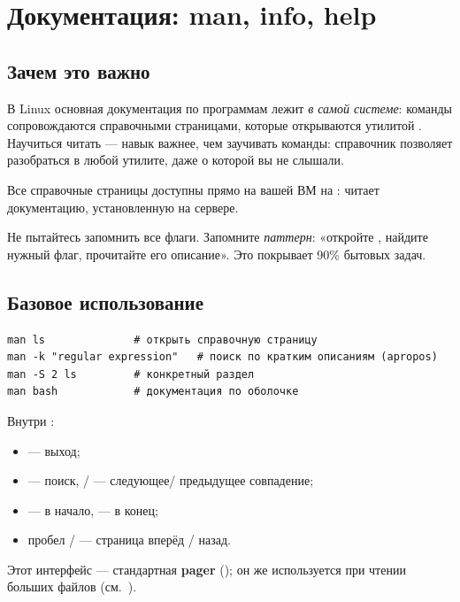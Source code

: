 \chapter{Документация: man, info, help}
\label{ch:06-man}

\section{Зачем это важно}

В Linux основная документация по программам лежит \emph{в самой
системе}: команды сопровождаются справочными страницами, которые
открываются утилитой . Научиться читать  ---
навык важнее, чем заучивать команды: справочник позволяет
разобраться в любой утилите, даже о которой вы не слышали.

Все справочные страницы доступны прямо на вашей ВМ на
:  читает документацию, установленную
на сервере.

\begin{tipbox}
Не пытайтесь запомнить все флаги. Запомните \emph{паттерн}:
«откройте , найдите нужный флаг, прочитайте его
описание». Это покрывает 90\% бытовых задач.
\end{tipbox}

\section{Базовое использование}

\begin{verbatim}
man ls              # открыть справочную страницу
man -k "regular expression"   # поиск по кратким описаниям (apropos)
man -S 2 ls         # конкретный раздел
man bash            # документация по оболочке
\end{verbatim}

Внутри :
\begin{itemize}
  \item {} --- выход;
  \item {} --- поиск,  /  --- следующее/
    предыдущее совпадение;
  \item {} --- в начало,  --- в конец;
  \item пробел /  --- страница вперёд / назад.
\end{itemize}

Этот интерфейс --- стандартная \textbf{pager} ();
он же используется при чтении больших файлов
(см.\ ).

